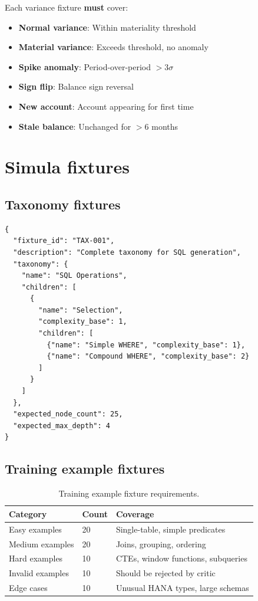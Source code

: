 Each variance fixture \textbf{must} cover:
\begin{itemize}
  \item \textbf{Normal variance}: Within materiality threshold
  \item \textbf{Material variance}: Exceeds threshold, no anomaly
  \item \textbf{Spike anomaly}: Period-over-period $>3\sigma$
  \item \textbf{Sign flip}: Balance sign reversal
  \item \textbf{New account}: Account appearing for first time
  \item \textbf{Stale balance}: Unchanged for $>$6 months
\end{itemize}

\section{Simula fixtures}

\subsection{Taxonomy fixtures}

\begin{lstlisting}[basicstyle=\ttfamily\small,caption={Taxonomy fixture structure.}]
{
  "fixture_id": "TAX-001",
  "description": "Complete taxonomy for SQL generation",
  "taxonomy": {
    "name": "SQL Operations",
    "children": [
      {
        "name": "Selection",
        "complexity_base": 1,
        "children": [
          {"name": "Simple WHERE", "complexity_base": 1},
          {"name": "Compound WHERE", "complexity_base": 2}
        ]
      }
    ]
  },
  "expected_node_count": 25,
  "expected_max_depth": 4
}
\end{lstlisting}

\subsection{Training example fixtures}

\begin{table}[htbp]
\centering
\caption{Training example fixture requirements.}
\label{tab:training-fixtures}
\footnotesize
\begin{tabularx}{\linewidth}{@{}l l X@{}}
\toprule
\textbf{Category} & \textbf{Count} & \textbf{Coverage} \\ \midrule
Easy examples & 20 & Single-table, simple predicates \\
Medium examples & 20 & Joins, grouping, ordering \\
Hard examples & 10 & CTEs, window functions, subqueries \\
Invalid examples & 10 & Should be rejected by critic \\
Edge cases & 10 & Unusual HANA types, large schemas \\
\bottomrule
\end{tabularx}
\end{table}

